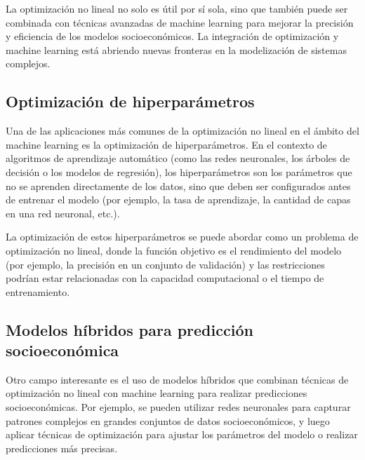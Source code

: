 \begin{flushleft}
	La optimización no lineal no solo es útil por sí sola, sino que también puede ser combinada con técnicas avanzadas de machine learning para mejorar la precisión y eficiencia de los modelos socioeconómicos. La integración de optimización y machine learning está abriendo nuevas fronteras en la modelización de sistemas complejos.
\end{flushleft}

\subsection{Optimización de hiperparámetros}

\begin{flushleft}
	Una de las aplicaciones más comunes de la optimización no lineal en el ámbito del machine learning es la optimización de hiperparámetros. En el contexto de algoritmos de aprendizaje automático (como las redes neuronales, los árboles de decisión o los modelos de regresión), los hiperparámetros son los parámetros que no se aprenden directamente de los datos, sino que deben ser configurados antes de entrenar el modelo (por ejemplo, la tasa de aprendizaje, la cantidad de capas en una red neuronal, etc.).
\end{flushleft}

\begin{flushleft}
	La optimización de estos hiperparámetros se puede abordar como un problema de optimización no lineal, donde la función objetivo es el rendimiento del modelo (por ejemplo, la precisión en un conjunto de validación) y las restricciones podrían estar relacionadas con la capacidad computacional o el tiempo de entrenamiento.
\end{flushleft}

\subsection{Modelos híbridos para predicción socioeconómica}

\begin{flushleft}
	Otro campo interesante es el uso de modelos híbridos que combinan técnicas de optimización no lineal con machine learning para realizar predicciones socioeconómicas. Por ejemplo, se pueden utilizar redes neuronales para capturar patrones complejos en grandes conjuntos de datos socioeconómicos, y luego aplicar técnicas de optimización para ajustar los parámetros del modelo o realizar predicciones más precisas.
\end{flushleft}

